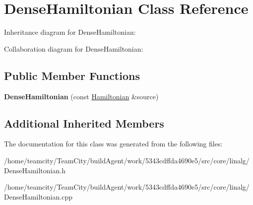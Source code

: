 \hypertarget{classDenseHamiltonian}{}\section{Dense\+Hamiltonian Class Reference}
\label{classDenseHamiltonian}


Inheritance diagram for Dense\+Hamiltonian\+:


Collaboration diagram for Dense\+Hamiltonian\+:
\subsection*{Public Member Functions}
\begin{DoxyCompactItemize}
\item 
{\bfseries Dense\+Hamiltonian} (const \hyperlink{classHamiltonian}{Hamiltonian} \&source)\hypertarget{classDenseHamiltonian_ad171bef2d0b359ea8f93a56b1932272d}{}\label{classDenseHamiltonian_ad171bef2d0b359ea8f93a56b1932272d}

\end{DoxyCompactItemize}
\subsection*{Additional Inherited Members}


The documentation for this class was generated from the following files\+:\begin{DoxyCompactItemize}
\item 
/home/teamcity/\+Team\+City/build\+Agent/work/5343cdffda4690e5/src/core/linalg/Dense\+Hamiltonian.\+h\item 
/home/teamcity/\+Team\+City/build\+Agent/work/5343cdffda4690e5/src/core/linalg/Dense\+Hamiltonian.\+cpp\end{DoxyCompactItemize}
